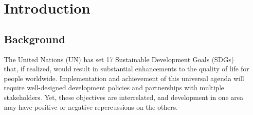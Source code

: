 \documentclass[10pt]{mcmthesis}
\begin{document}
\maketitle



%




\thispagestyle{empty}
\newpage

\begin{spacing}{0.2}
    \tableofcontents
\end{spacing}

\newpage
\setcounter{page}{1}

\section{Introduction}

\subsection{Background}


The United Nations (UN) \cite{aguiar2015has} has set 17 Sustainable Development Goals (SDGs) that, if realized, would result in substantial enhancements to the quality of life for people worldwide. Implementation and achievement of this universal agenda will require well-designed development policies and partnerships with multiple stakeholders. Yet, these objectives are interrelated, and development in one area may have positive or negative repercussions on the others. 
\end{document}
